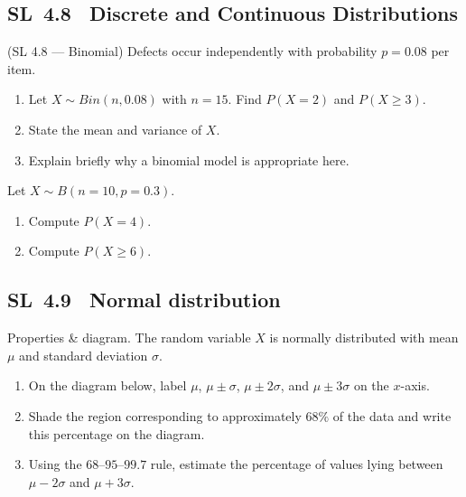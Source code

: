\documentclass[11pt]{article}
\def\textbf#1{#1}%
\def\mathrm#1{#1}%
\newcommand{\tocsubsection}[1]{\subsection{#1}}
\newcounter{question}
\begin{document}
\tocsubsection{SL 4.8 \; Discrete and Continuous Distributions}
\begin{question}
\textbf{(SL 4.8 — Binomial)} Defects occur independently with probability $p=0.08$ per item.
\begin{enumerate}
  \item Let $X\sim\mathrm{Bin}(n,0.08)$ with $n=15$. Find $P(X=2)$ and $P(X\ge 3)$.
  \item State the mean and variance of $X$.
  \item Explain briefly why a binomial model is appropriate here.
\end{enumerate}
\end{question}

\begin{question}
Let $X\sim\mathrm{B}(n=10,p=0.3)$.
\begin{enumerate}[label=(\roman*)]
\item Compute $P(X=4)$.
\item Compute $P(X\ge 6)$.
\end{enumerate}
\end{question}

\tocsubsection{SL 4.9 \; Normal distribution}



\begin{question}
\textbf{Properties \& diagram.} The random variable $X$ is normally distributed with mean $\mu$ and standard deviation $\sigma$.
\begin{enumerate}
  \item On the diagram below, label $\mu$, $\mu\pm\sigma$, $\mu\pm2\sigma$, and $\mu\pm3\sigma$ on the $x$-axis.
  \item Shade the region corresponding to approximately $68\%$ of the data and write this percentage on the diagram.
  \item Using the $68$–$95$–$99.7$ rule, estimate the percentage of values lying between $\mu-2\sigma$ and $\mu+3\sigma$.
\end{enumerate}

\begin{center}
\end{center}
\end{question}
\end{document}

